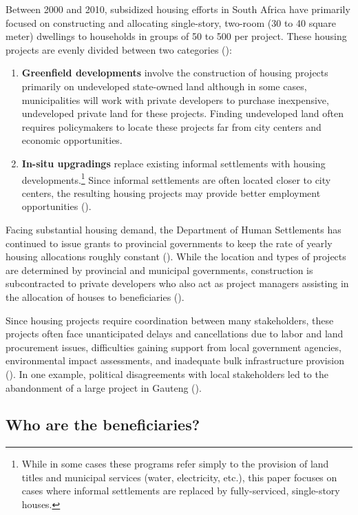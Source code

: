 \documentclass[12pt]{article}
\begin{document}
Between 2000 and 2010, subsidized housing efforts in South Africa have primarily focused on constructing and allocating single-story, two-room (30 to 40 square meter) dwellings to households in groups of 50 to 500 per project.  These housing projects are evenly divided between two categories (\cite{dhsreports}):
\begin{enumerate}
	\item  \textbf{Greenfield developments} involve the construction of housing projects primarily on undeveloped state-owned land although in some cases, municipalities will work with private developers to purchase inexpensive, undeveloped private land for these projects.  Finding undeveloped land often requires policymakers to locate these projects far from city centers and economic opportunities.  
	\item  \textbf{In-situ upgradings} replace existing informal settlements with housing developments.\footnote{While in some cases these programs refer simply to the provision of land titles and municipal services (water, electricity, etc.), this paper focuses on cases where informal settlements are replaced by fully-serviced, single-story houses.}  Since informal settlements are often located closer to city centers, the resulting housing projects may provide better employment opportunities (\cite{serihistory}).
\end{enumerate}
Facing substantial housing demand, the Department of Human Settlements has continued to issue grants to provincial governments to keep the rate of yearly housing allocations roughly constant (\cite{dhsreports}).  While the location and types of projects are determined by provincial and municipal governments, construction is subcontracted to private developers who also act as project managers assisting in the allocation of houses to beneficiaries (\cite{seriq}).

Since housing projects require coordination between many stakeholders, these projects often face unanticipated delays and cancellations due to labor and land procurement issues, difficulties gaining support from local government agencies, environmental impact assessments, and inadequate bulk infrastructure provision (\cite{dhsreports}).  In one example, political disagreements with local stakeholders led to the abandonment of a large project in Gauteng (\cite{protest}).

\subsection{Who are the beneficiaries?}
\end{document}
